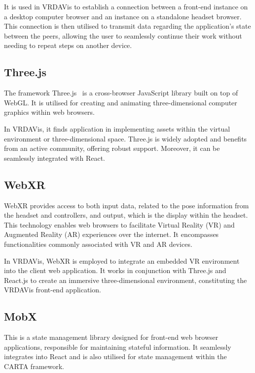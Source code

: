 It is used in VRDAVis to establish a connection between a front-end instance on a desktop computer browser and an instance on a standalone headset browser. This connection is then utilised to transmit data regarding the application's state between the peers, allowing the user to seamlessly continue their work without needing to repeat steps on another device.


\subsection{Three.js}
The framework Three.js~\cite{Danchilla2012} is a cross-browser JavaScript library built on top of WebGL. 
It is utilised for creating and animating three-dimensional computer graphics within web browsers.

In VRDAVis, it finds application in implementing assets within the virtual environment or three-dimensional space. Three.js is widely adopted and benefits from an active community, offering robust support. Moreover, it can be seamlessly integrated with React.

\subsection{WebXR}
WebXR provides access to both input data, related to the pose information from the headset and controllers, and output, which is the display within the headset. This technology enables web browsers to facilitate Virtual Reality (VR) and Augmented Reality (AR) experiences over the internet. It encompasses functionalities commonly associated with VR and AR devices.

In VRDAVis, WebXR is employed to integrate an embedded VR environment into the client web application. It works in conjunction with Three.js and React.js to create an immersive three-dimensional environment, constituting the VRDAVis front-end application.

\subsection{MobX}
This is a state management library designed for front-end web browser applications, responsible for maintaining stateful information. It seamlessly integrates into React and is also utilised for state management within the CARTA framework.

